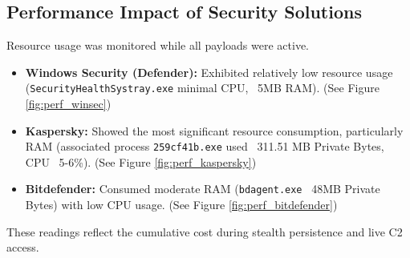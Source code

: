 \documentclass[11pt]{article}
\begin{document}
	\subsection{Performance Impact of Security Solutions}
	Resource usage was monitored while all payloads were active.
	\begin{itemize}
		\item \textbf{Windows Security (Defender):} Exhibited relatively low resource usage \\
		(\texttt{SecurityHealthSystray.exe} minimal CPU, ~5MB RAM). (See Figure \ref{fig:perf_winsec})
		\item \textbf{Kaspersky:} Showed the most significant resource consumption, particularly RAM (associated process \texttt{259cf41b.exe} used ~311.51 MB Private Bytes, CPU ~5-6\%). (See Figure \ref{fig:perf_kaspersky})
		\item \textbf{Bitdefender:} Consumed moderate RAM (\texttt{bdagent.exe} ~48MB Private Bytes) with low CPU usage. (See Figure \ref{fig:perf_bitdefender})
	\end{itemize}
	These readings reflect the cumulative cost during stealth persistence and live C2 access.
	
\end{document}
